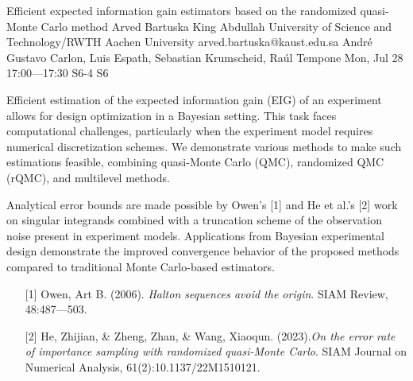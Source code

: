 \begin{talk}
  {Efficient expected information gain estimators based on the randomized quasi-Monte Carlo method}%
  {Arved Bartuska}%
  {King Abdullah University of Science and Technology/RWTH Aachen University}%
  {arved.bartuska@kaust.edu.sa}%
  {Andr\'{e} Gustavo Carlon, Luis Espath, Sebastian Krumscheid, Ra\'{u}l Tempone}%
  {}%
  {Mon, Jul 28 17:00---17:30}%
  {S6-4}%
  {S6}%
  
    
   
Efficient estimation of the expected information gain (EIG) of an experiment allows for design optimization in a Bayesian setting. This task faces computational challenges, particularly when the experiment model requires numerical discretization schemes. We demonstrate various methods to make such estimations feasible, combining quasi-Monte Carlo (QMC), randomized QMC (rQMC), and multilevel methods.

Analytical error bounds are made possible by Owen's [1] and He et al.'s [2] work on singular integrands combined with a truncation scheme of the observation noise present in experiment models. Applications from Bayesian experimental design demonstrate the improved convergence behavior of the proposed methods compared to traditional Monte Carlo-based estimators.

\medskip

\begin{enumerate}
 \item[{[1]}] Owen, Art B. (2006). {\it Halton sequences avoid the origin}. SIAM Review, 48:487---503.
 \item[{[2]}] He, Zhijian, \& Zheng, Zhan, \& Wang, Xiaoqun. (2023).{\it On the error rate of importance sampling with randomized quasi-Monte Carlo}. SIAM Journal
on Numerical Analysis,  61(2):10.1137/22M1510121.
\end{enumerate}

\end{talk}

